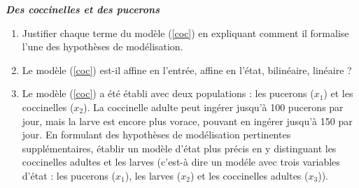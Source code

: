 \begin{exercice}{\bf \em Des coccinelles et des pucerons}

\begin{enumerate}
\item Justifier chaque terme du modèle (\ref{coc}) en expliquant comment il formalise l'une des hypothèses de modélisation.
\item Le modèle (\ref{coc}) est-il affine en l'entrée, affine en l'état, bilinéaire, linéaire ? 
\item Le modèle (\ref{coc}) a été établi avec deux populations : les pucerons ($x_1$) et les coccinelles ($x_2$). La coccinelle adulte peut ingérer jusqu'à 100 pucerons par jour, mais la larve est encore plus vorace, pouvant en ingérer jusqu'à 150 par jour. En formulant des hypothèses de modélisation pertinentes supplémentaires, établir un modèle d'état plus précis en y distinguant les coccinelles adultes et les larves (c'est-à dire un mod\' ele avec trois variables d'état : les pucerons ($x_1$), les larves ($x_2$) et les coccinelles adultes ($x_3$)).
\end{enumerate}
\end{exercice}




